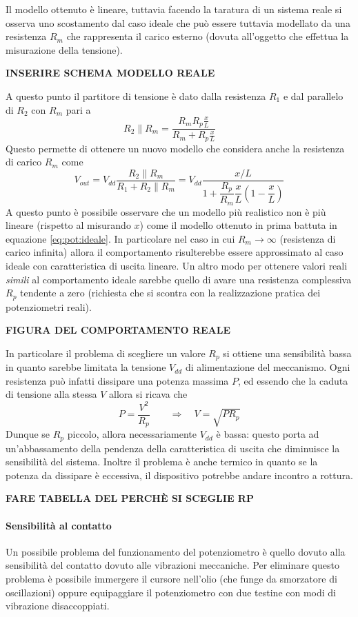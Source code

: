 	Il modello ottenuto è lineare, tuttavia facendo la taratura di un sistema reale si osserva uno scostamento dal caso ideale che può essere tuttavia modellato da una resistenza $R_m$ che rappresenta il carico esterno (dovuta all'oggetto che effettua la misurazione della tensione).
	
	\textbf{INSERIRE SCHEMA MODELLO REALE} 
	
	A questo punto il partitore di tensione è dato dalla resistenza $R_1$ e dal parallelo di $R_2$ con $R_m$ pari a 
	\[ R_2 \parallel R_m = \frac{R_mR_p \frac x L}{R_m + R_p \frac x L} \qquad\]
	Questo permette di ottenere un nuovo modello che considera anche la resistenza di carico $R_m$ come
	\[ V_{out} = V_{dd} \frac{R_2\parallel R_m}{ R_1 + R_2\parallel R_m} = V_{dd} \frac{x/L}{1 + \dfrac{R_p}{R_m} \dfrac{x}{L} \left(1 - \dfrac x L\right)   } \]
	A questo punto è possibile osservare che un modello più realistico non è più lineare (rispetto al misurando $x$) come il modello ottenuto in prima battuta in equazione \ref{eq:pot:ideale}. In particolare nel caso in cui $R_m \rightarrow \infty$ (resistenza di carico infinita) allora il comportamento risulterebbe essere approssimato al caso ideale con caratteristica di uscita lineare. Un altro modo per ottenere valori reali \textit{simili} al comportamento ideale sarebbe quello di avare una resistenza complessiva $R_p$ tendente a zero (richiesta che si scontra con la realizzazione pratica dei potenziometri reali).
	
	\textbf{FIGURA DEL COMPORTAMENTO REALE}
	
	In particolare il problema di scegliere un valore $R_p$ si ottiene una sensibilità bassa in quanto sarebbe limitata  la tensione $V_{dd}$ di alimentazione del meccanismo. Ogni resistenza può infatti dissipare una potenza massima $P$, ed essendo che la caduta di tensione alla stessa $V$ allora si ricava che
	\[P = \frac{V^2}{R_p} \qquad \Rightarrow \quad V = \sqrt{PR_p}\]
	Dunque se $R_p$ piccolo, allora necessariamente $V_{dd}$ è bassa: questo porta ad un'abbassamento della pendenza della caratteristica di uscita che diminuisce la sensibilità del sistema. Inoltre il problema è anche termico in quanto se la potenza da dissipare è eccessiva, il dispositivo potrebbe andare incontro a rottura.
	
	\textbf{FARE TABELLA DEL PERCHÈ SI SCEGLIE RP}
	
	\paragraph{Sensibilità al contatto} Un possibile problema del funzionamento del potenziometro è quello dovuto alla sensibilità del contatto dovuto alle vibrazioni meccaniche. Per eliminare questo problema è possibile immergere il cursore nell'olio (che funge da smorzatore di oscillazioni) oppure equipaggiare il potenziometro con due testine con modi di vibrazione disaccoppiati.
	
	
	
	
	
	
	
	
	
	
	
	
	
	
	
	
	
	
	
	